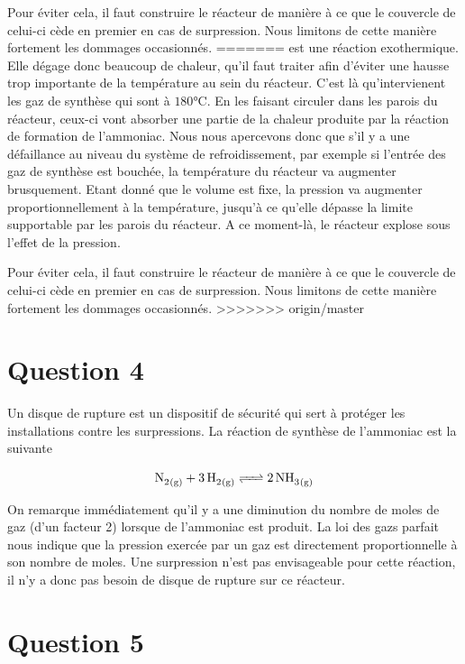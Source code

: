 \documentclass[a4paper,oneside,12pt]{article}
\begin{document}
Pour éviter cela, il faut construire le réacteur de manière à ce que le couvercle de celui-ci cède en premier en cas de surpression. Nous limitons de cette manière fortement les dommages occasionnés.
=======
est une réaction exothermique. Elle dégage donc beaucoup de chaleur, 
qu'il faut traiter afin d'éviter une hausse trop importante de la température au sein 
du réacteur. C'est là qu'intervienent les gaz de synthèse  
qui sont à $180\si{\celsius}$. En les faisant circuler dans les parois du réacteur, 
ceux-ci vont absorber une partie de la chaleur produite par la réaction de formation 
de l'ammoniac. Nous nous apercevons donc que s'il y a une défaillance au niveau du système 
de refroidissement, par exemple si l'entrée des gaz de synthèse est bouchée, 
la température du réacteur va augmenter brusquement. Etant donné que le volume est fixe, 
la pression va augmenter proportionnellement à la température, 
jusqu'à ce qu'elle dépasse la limite supportable par les parois du réacteur. 
A ce moment-là, le réacteur explose sous l'effet de la pression.

Pour éviter cela, il faut construire le réacteur de manière à ce que 
le couvercle de celui-ci cède en premier en cas de surpression. 
Nous limitons de cette manière fortement les dommages occasionnés.
>>>>>>> origin/master

\section*{Question 4}

Un disque de rupture est un dispositif de sécurité qui sert à protéger les installations 
contre les surpressions.
La réaction de synthèse de l'ammoniac est la suivante

\[
	\ce{N2_{(g)} + 3H2_{(g)} <=> 2NH3_{(g)}}
\]

On remarque immédiatement qu'il y a une diminution du nombre de moles de gaz (d'un facteur 2) 
lorsque de l'ammoniac est produit. La loi des gazs parfait nous indique que la pression
exercée par un gaz est directement proportionnelle à son nombre de moles.
Une surpression n'est pas envisageable pour cette réaction, 
il n'y a donc pas besoin de disque de rupture sur ce réacteur.

\section*{Question 5}
\end{document}
